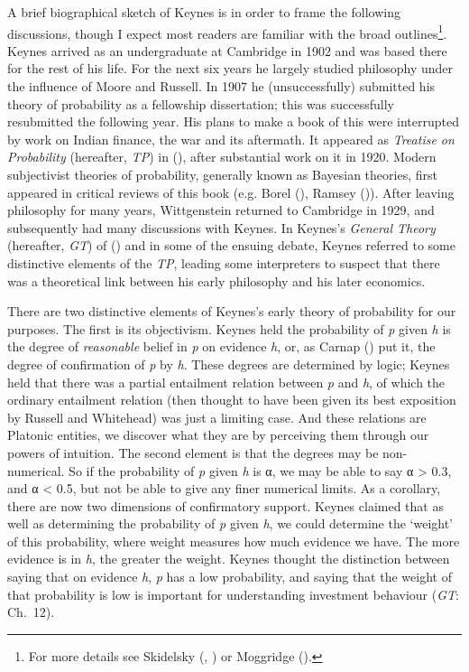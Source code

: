 \documentclass[
  10pt,
  letterpaper,
  DIV=11,
  numbers=noendperiod,
  twoside]{scrartcl}
\begin{document}
A brief biographical sketch of Keynes is in order to frame the following
discussions, though I expect most readers are familiar with the broad
outlines\footnote{For more details see Skidelsky
  (,
  ) or Moggridge
  ().}. Keynes arrived as an
undergraduate at Cambridge in 1902 and was based there for the rest of
his life. For the next six years he largely studied philosophy under the
influence of Moore and Russell. In 1907 he (unsuccessfully) submitted
his theory of probability as a fellowship dissertation; this was
successfully resubmitted the following year. His plans to make a book of
this were interrupted by work on Indian finance, the war and its
aftermath. It appeared as \emph{Treatise on Probability} (hereafter,
\emph{TP}) in (), after substantial work
on it in 1920. Modern subjectivist theories of probability, generally
known as Bayesian theories, first appeared in critical reviews of this
book (e.g. Borel (), Ramsey
()). After leaving philosophy for
many years, Wittgenstein returned to Cambridge in 1929, and subsequently
had many discussions with Keynes. In Keynes's \emph{General Theory}
(hereafter, \emph{GT}) of () and in some
of the ensuing debate, Keynes referred to some distinctive elements of
the \emph{TP}, leading some interpreters to suspect that there was a
theoretical link between his early philosophy and his later economics.

There are two distinctive elements of Keynes's early theory of
probability for our purposes. The first is its objectivism. Keynes held
the probability of \emph{p} given \emph{h} is the degree of
\emph{reasonable} belief in \emph{p} on evidence \emph{h}, or, as Carnap
() put it, the degree of confirmation of
\emph{p} by \emph{h}. These degrees are determined by logic; Keynes held
that there was a partial entailment relation between \emph{p} and
\emph{h}, of which the ordinary entailment relation (then thought to
have been given its best exposition by Russell and Whitehead) was just a
limiting case. And these relations are Platonic entities, we discover
what they are by perceiving them through our powers of intuition. The
second element is that the degrees may be non-numerical. So if the
probability of \emph{p} given \emph{h} is α, we may be able to say α
\textgreater{} 0.3, and α \textless{} 0.5, but not be able to give any
finer numerical limits. As a corollary, there are now two dimensions of
confirmatory support. Keynes claimed that as well as determining the
probability of \emph{p} given \emph{h}, we could determine the `weight'
of this probability, where weight measures how much evidence we have.
The more evidence is in \emph{h}, the greater the weight. Keynes thought
the distinction between saying that on evidence \emph{h}, \emph{p} has a
low probability, and saying that the weight of that probability is low
is important for understanding investment behaviour (\emph{GT}: Ch.~12).
\end{document}
